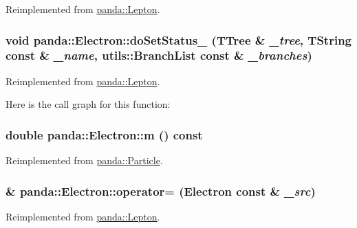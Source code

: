 Reimplemented from \hyperlink{classpanda_1_1Lepton_a2d46b07ce93bec008954f222c6860ff9}{panda::Lepton}.\hypertarget{classpanda_1_1Electron_af73c3c5f59267c4bba4ceb0a47cfc6ec}{
\subsubsection[{doSetStatus\_\-}]{\setlength{\rightskip}{0pt plus 5cm}void panda::Electron::doSetStatus\_\- (TTree \& {\em \_\-tree}, \/  TString const \& {\em \_\-name}, \/  {\bf utils::BranchList} const \& {\em \_\-branches})}}
\label{classpanda_1_1Electron_af73c3c5f59267c4bba4ceb0a47cfc6ec}


Reimplemented from \hyperlink{classpanda_1_1Lepton_a2d3b49322244947c933645bbdb44bf88}{panda::Lepton}.

Here is the call graph for this function:\hypertarget{classpanda_1_1Electron_a809cee4161783ff5d00b69e24c125759}{
\subsubsection[{m}]{\setlength{\rightskip}{0pt plus 5cm}double panda::Electron::m () const}}
\label{classpanda_1_1Electron_a809cee4161783ff5d00b69e24c125759}


Reimplemented from \hyperlink{classpanda_1_1Particle_aa793c05fc1334ed462e18c794339eebf}{panda::Particle}.\hypertarget{classpanda_1_1Electron_adf667b212f1ea11094dd276fd913c4f6}{
\subsubsection[{operator=}]{ \& panda::Electron::operator= ({\bf Electron} const \& {\em \_\-src})}}
\label{classpanda_1_1Electron_adf667b212f1ea11094dd276fd913c4f6}


Reimplemented from \hyperlink{classpanda_1_1Lepton_a24b1cd552930db2af2734d3acbb27257}{panda::Lepton}.

